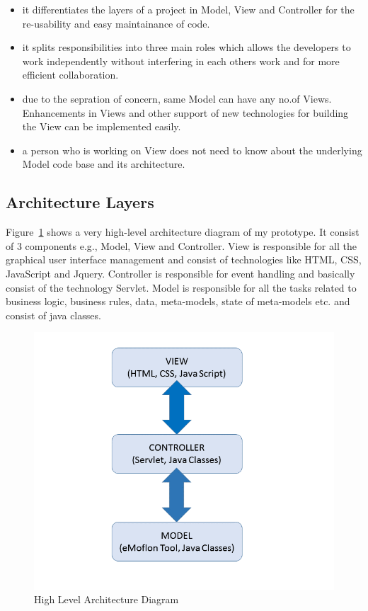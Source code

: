 \begin{itemize}
	\item {it differentiates the layers of a project in Model, View and Controller for the re-usability and easy maintainance of code.}
	\item {it splits responsibilities into three main roles which allows the developers to work independently without interfering in each others work and for more efficient collaboration.}
	\item {due to the sepration of concern, same Model can have any no.of Views. Enhancements in Views and other support of new technologies for building the View can be implemented easily.}
	\item {a person who is working on View does not need to know about the underlying Model code base and its architecture.}
\end{itemize}

\subsection{Architecture Layers}\label{subsec:design_layers}
Figure~\ref{fig:Architecture_Diagram} shows a very high-level architecture diagram of my prototype. It consist of 3 components e.g., Model, View and Controller. View is responsible for all the graphical user interface management and consist of technologies like HTML, CSS, JavaScript and Jquery. Controller is responsible for event handling and basically consist of the technology Servlet. Model is responsible for all the tasks related to business logic, business rules, data, meta-models, state of meta-models etc. and consist of java classes.

\begin{figure}
	\includegraphics[width=1\textwidth]{figures/Highlevel_Arch}
	\caption{High Level Architecture Diagram}
	\label{fig:Architecture_Diagram}
\end{figure}

